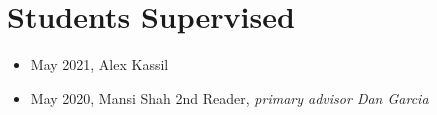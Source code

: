 \section{Students Supervised}

\vspace{6pt}

\begin{itemize}

  \setlength\itemsep{1em}

    
    \item{May 2021, Alex Kassil}
    
    \item{May 2020, Mansi Shah 2nd Reader, \textit{primary advisor Dan Garcia}}

\end{itemize}

\vspace{3pt}
